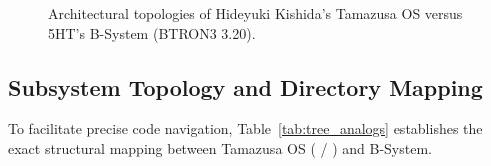 \documentclass[10pt,journal,compsoc,twocolumn]{article}
\begin{document}
\begin{figure}[t]
\caption{Architectural topologies of Hideyuki Kishida's Tamazusa OS versus 5HT's B-System (BTRON3 3.20).}
\label{fig:arch_comparison}
\end{figure}

\subsection{Subsystem Topology and Directory Mapping}
\label{sec:subsystem_topology}
To facilitate precise code navigation, Table~\ref{tab:tree_analogs} establishes the exact structural mapping between Tamazusa OS ( / ) and B-System.
\end{document}
